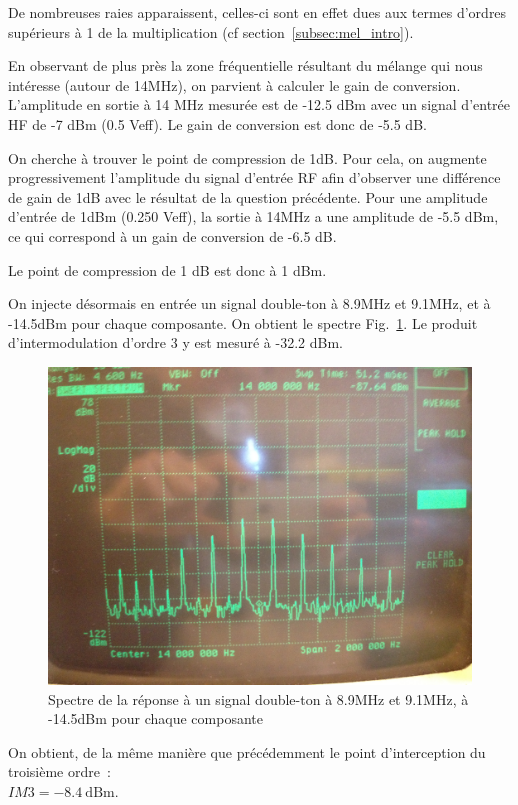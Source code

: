 \documentclass{article}
\begin{document}
De nombreuses raies apparaissent, celles-ci sont en effet dues aux termes d'ordres supérieurs à 1 de la multiplication (cf section~\ref{subsec:mel_intro}).



En observant de plus près la zone fréquentielle résultant du mélange qui nous intéresse (autour de 14MHz), on parvient à calculer le gain de conversion.
L'amplitude en sortie à 14 MHz mesurée est de -12.5 dBm avec un signal d'entrée HF de -7 dBm (0.5 Veff).
Le gain de conversion est donc de -5.5 dB.



On cherche à trouver le point de compression de 1dB. Pour cela, on augmente progressivement l'amplitude du signal d'entrée RF afin d'observer une différence de gain de 1dB avec le résultat de la question précédente.
Pour une amplitude d'entrée de 1dBm (0.250 Veff), la sortie à 14MHz a une amplitude de -5.5 dBm, ce qui correspond à un gain de conversion de -6.5 dB.

Le point de compression de 1 dB est donc à 1 dBm.


On injecte désormais en entrée un signal double-ton à 8.9MHz et 9.1MHz, et à -14.5dBm pour chaque composante.
On obtient le spectre Fig.~\ref{fig:9_3_4}. Le produit d'intermodulation d'ordre 3 y est mesuré à -32.2 dBm.

\begin{figure}[h!]
	\centering
	\includegraphics[width=.7\textwidth]{9_3_4}
	\caption{Spectre de la réponse à un signal double-ton à 8.9MHz et 9.1MHz, à -14.5dBm pour chaque composante}
	\label{fig:9_3_4}
\end{figure}


On obtient, de la même manière que précédemment le point d'interception du troisième ordre~:\\${IM3 = \mathrm{-8.4~dBm}}$.
\end{document}

